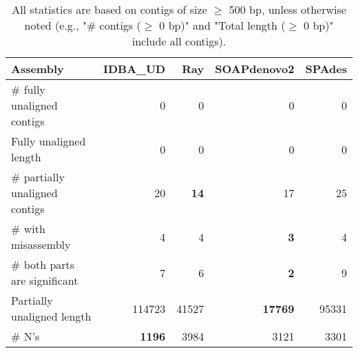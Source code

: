 \documentclass[12pt,a4paper]{article}
\begin{document}
\begin{table}[ht]
\begin{center}
\caption{All statistics are based on contigs of size $\geq$ 500 bp, unless otherwise noted (e.g., "\# contigs ($\geq$ 0 bp)" and "Total length ($\geq$ 0 bp)" include all contigs).}
\begin{tabular}{|l*{4}{|r}|}
\hline
Assembly & IDBA\_UD & Ray & SOAPdenovo2 & SPAdes \\ \hline
\# fully unaligned contigs & 0 & 0 & 0 & 0 \\ \hline
Fully unaligned length & 0 & 0 & 0 & 0 \\ \hline
\# partially unaligned contigs & 20 & {\bf 14} & 17 & 25 \\ \hline
\hspace{5mm}\# with misassembly & 4 & 4 & {\bf 3} & 4 \\ \hline
\hspace{5mm}\# both parts are significant & 7 & 6 & {\bf 2} & 9 \\ \hline
Partially unaligned length & 114723 & 41527 & {\bf 17769} & 95331 \\ \hline
\# N's & {\bf 1196} & 3984 & 3121 & 3301 \\ \hline
\end{tabular}
\end{center}
\end{table}
\end{document}

